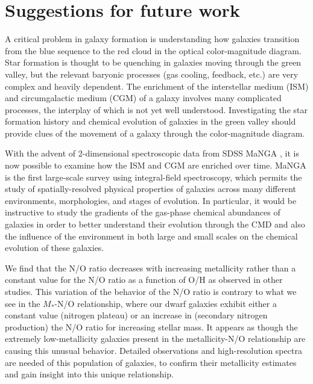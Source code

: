 \section[Future work]{Suggestions for future work}



A critical problem in galaxy formation is understanding how galaxies transition 
from the blue sequence to the red cloud in the optical color-magnitude diagram.  
Star formation is thought to be quenching in galaxies moving through the green 
valley, but the relevant baryonic processes (gas cooling, feedback, etc.) are 
very complex and heavily dependent.  The enrichment of the interstellar medium 
(ISM) and circumgalactic medium (CGM) of a galaxy involves many complicated 
processes, the interplay of which is not yet well understood.  Investigating the 
star formation history and chemical evolution of galaxies in the green valley 
should provide clues of the movement of a galaxy through the color-magnitude 
diagram.

With the advent of 2-dimensional spectroscopic data from SDSS MaNGA \citep{MaNGA,
SDSS13}, it is now possible to examine how the ISM and CGM are enriched over 
time.  MaNGA is the first large-scale survey using integral-field spectroscopy, 
which permits the study of spatially-resolved physical properties of galaxies 
across many different environments, morphologies, and stages of evolution.  In 
particular, it would be instructive to study the gradients of the gas-phase 
chemical abundances of galaxies in order to better understand their evolution 
through the CMD and also the influence of the environment in both large and 
small scales on the chemical evolution of these galaxies.

We find that the N/O ratio decreases with increasing metallicity rather than a 
constant value for the N/O ratio as a function of O/H as observed in other 
studies.  This variation of the behavior of the N/O ratio is contrary to what we 
see in the $M_*$-N/O relationship, where our dwarf galaxies exhibit either a 
constant value (nitrogen plateau) or an increase in (secondary nitrogen 
production) the N/O ratio for increasing stellar mass.  It appears as though the 
extremely low-metallicity galaxies present in the metallicity-N/O relationship 
are causing this unusual behavior.  Detailed observations and high-resolution 
spectra are needed of this population of galaxies, to confirm their metallicity 
estimates and gain insight into this unique relationship.

